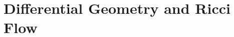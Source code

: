 \documentclass[a4paper,12pt,oneside,customfont,custombib,PageStyleI]{Settings/PhDThesisPSnPDF}
\begin{document}
\chapter{Differential Geometry and Ricci Flow}\label{chap:chapter2}
%


%

\backmatter

\begin{spacing}{0.9}

\cleardoublepage
\nocite{*}
\printbibliography[heading=bibintoc, title={References}]

\end{spacing}

\end{document}
